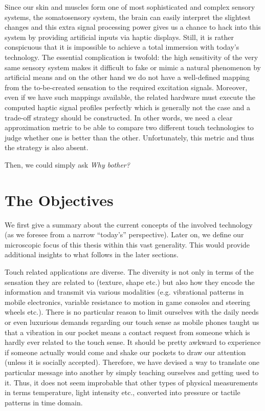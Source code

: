 Since our skin and muscles form one of most sophisticated and complex sensory systems, the somatosensory system, the brain can easily 
interpret the slightest changes and this extra signal processing power gives us a chance to hack into this system by providing artificial 
inputs via haptic displays. Still, it is rather conspicuous that it is impossible to achieve a total immersion with today's technology. 
The essential complication is twofold: the high sensitivity of the very same sensory system makes it difficult to fake or mimic a natural 
phenomenon by artificial means and on the other hand we do not have a well-defined mapping from the to-be-created sensation to the 
required excitation signals. Moreover, even if we have such mappings available, the related hardware must execute the computed haptic 
signal profiles perfectly which is generally not the case and a trade-off strategy should be constructed. In other words, we need a clear 
approximation metric to be able to compare two different touch technologies to judge whether one is better than the other. Unfortunately, 
this metric and thus the strategy is also absent. 
 
Then, we could simply ask \emph{Why bother?} 


\section{The Objectives}
\label{sec:intro:obj}

We first give a summary about the current concepts of the involved technology (as we foresee from a narrow \enquote{today's} perspective). 
Later on, we define our microscopic focus of this thesis within this vast generality. This would provide additional insights to what follows 
in the later sections.  


Touch related applications are diverse. The diversity is not only in terms of the sensation they are related to (texture, shape etc.) but 
also how they encode the information and transmit via various modalities (e.g. vibrational patterns in mobile electronics, variable 
resistance to motion in game consoles and steering wheels etc.). There is no particular reason to limit ourselves with the daily needs or 
even luxurious demands regarding our touch sense as mobile phones taught us that a vibration in our pocket means a contact request from 
someone which is hardly ever related to the touch sense. It should be pretty awkward to experience if someone actually would come and 
shake our pockets to draw our attention (unless it is socially accepted). Therefore, we have devised a way to translate one particular 
message into another by simply teaching ourselves and getting used to it. Thus, it does not seem improbable that other types of physical 
measurements in terms temperature, light intensity etc., converted into pressure or tactile patterns in time domain.

